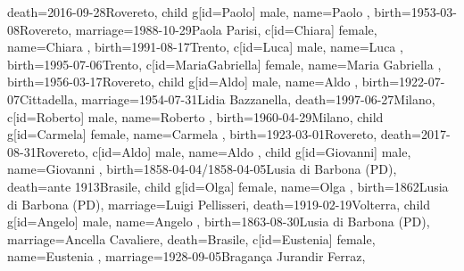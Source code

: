 \documentclass{article}
\begin{document}
\begin{midpage}
\begin{center}
\begin{genealogypicture}
{{{{{{                        death={2016-09-28}{Rovereto},
                    }
                    child{
                        g[id=Paolo]{
                            male,
                            name={Paolo },
                            birth={1953-03-08}{Rovereto},
                            marriage={1988-10-29}{Paola Parisi},
                        }
                        c[id=Chiara]{
                            female,
                            name={Chiara },
                            birth={1991-08-17}{Trento},
                        }
                        c[id=Luca]{
                            male,
                            name={Luca },
                            birth={1995-07-06}{Trento},
                        }
                    }
                    c[id=MariaGabriella]{
                        female,
                        name={Maria Gabriella },
                        birth={1956-03-17}{Rovereto},
                    }
                }
                child{
                    g[id=Aldo]{
                        male,
                        name={Aldo },
                        birth={1922-07-07}{Cittadella},
                        marriage={1954-07-31}{Lidia Bazzanella},
                        death={1997-06-27}{Milano},
                    }
                    c[id=Roberto]{
                        male,
                        name={Roberto },
                        birth={1960-04-29}{Milano},
                    }
                }
                child{
                    g[id=Carmela]{
                        female,
                        name={Carmela },
                        birth={1923-03-01}{Rovereto},
                        death={2017-08-31}{Rovereto},
                    }
                    c[id=Aldo]{
                        male,
                        name={Aldo },
                    }
                }
            }
        }
        child{
            g[id=Giovanni]{
                male,
                name={Giovanni },
                birth={1858-04-04/1858-04-05}{Lusia di Barbona (PD)},
                death={ante 1913}{Brasile},
            }
        }
        child{
            g[id=Olga]{
                female,
                name={Olga },
                birth={1862}{Lusia di Barbona (PD)},
                marriage={Luigi Pellisseri}{},
                death={1919-02-19}{Volterra},
            }
        }
        child{
            g[id=Angelo]{
                male,
                name={Angelo },
                birth={1863-08-30}{Lusia di Barbona (PD)},
                marriage={Ancella Cavaliere}{},
                death={Brasile}{},
            }
            c[id=Eustenia]{
                female,
                name={Eustenia },
                marriage={1928-09-05}{Bragança \newline Jurandir Ferraz},
            }
        }
    }
}
\end{genealogypicture}

\end{center}
\end{midpage}
\end{document}
